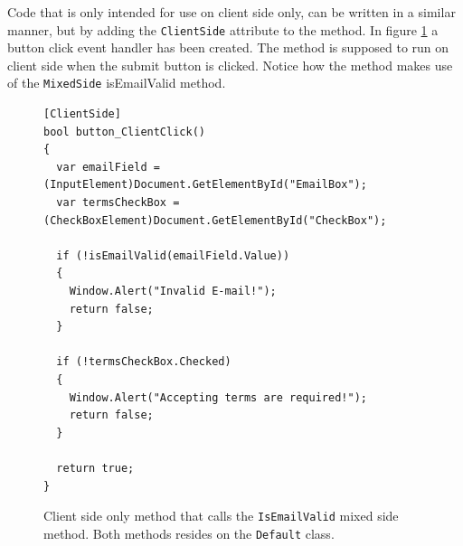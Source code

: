 Code that is only intended for use on client side only, can be written in a similar manner, but by adding the \texttt{ClientSide} attribute to the method. In figure \ref{fig:write_mics_code_clienside} a button click event handler has been created. The method is supposed to run on client side when the submit button is clicked. Notice how the method makes use of the \texttt{MixedSide} isEmailValid method.


\begin{figure}[H]
\begin{lstlisting}[language=CSharp,classoffset=1,morekeywords={Default,MiCSPage,Button,CheckBox,TextBox,EventArgs,ClientSide,InputElement,Document,CheckBoxElement,Window,MixedSide,Regex}]
[ClientSide]
bool button_ClientClick()
{
  var emailField = (InputElement)Document.GetElementById("EmailBox");
  var termsCheckBox = (CheckBoxElement)Document.GetElementById("CheckBox");
  
  if (!isEmailValid(emailField.Value))
  {
    Window.Alert("Invalid E-mail!");
    return false;
  }
  
  if (!termsCheckBox.Checked)
  {
    Window.Alert("Accepting terms are required!");
    return false;
  }
  
  return true;
}
\end{lstlisting}
\caption{Client side only method that calls the \texttt{IsEmailValid} mixed side method. Both methods resides on the \texttt{Default} class.}
\label{fig:write_mics_code_clienside}
\end{figure}


